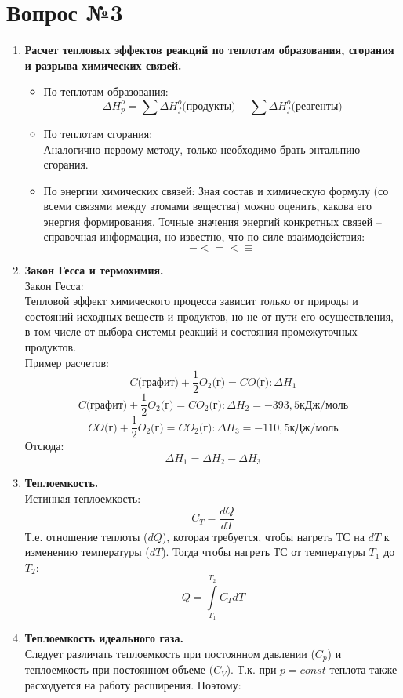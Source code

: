 \documentclass[14pt,a4paper]{scrartcl}
\begin{document}
\section*{Вопрос №3}	
	\begin{enumerate}[label=\arabic*)]
		\item \textbf{Расчет тепловых эффектов реакций по теплотам образования, сгорания и разрыва химических связей.}
		\begin{itemize}
			\item По теплотам образования: 
			$$\Delta{H_{p}^{o}} = \sum \Delta{H_{f}^o} \text{(продукты)} - \sum \Delta{H_{f}^o} \text{(реагенты)}  $$
			\item По теплотам сгорания: \\
			Аналогично первому методу, только необходимо брать энтальпию сгорания.
			\item По энергии химических связей:
			Зная состав и химическую формулу (со всеми связями между атомами вещества) можно оценить, какова его энергия формирования. Точные значения энергий конкретных связей -- справочная информация, но известно, что по силе взаимодействия:
			$$ -  <  =  <  \equiv $$
		\end{itemize}
		\item \textbf{Закон Гесса и термохимия.} \\
		Закон Гесса: \\
		Тепловой эффект химического процесса зависит только от природы и состояний исходных веществ и продуктов, но не от пути его осуществления, в том числе от выбора системы реакций и состояния промежуточных продуктов. \\
		Пример расчетов: \\
		$$C\text{(графит)} + \frac{1}{2}O_2\text{(г)} = CO\text{(г)}: \Delta{H_1}$$  
		$$C\text{(графит)} + \frac{1}{2}O_2\text{(г)} = CO_2\text{(г)}: \Delta{H_2} = -393,5 \text{кДж/моль}$$  			
		$$CO\text{(г)} + \frac{1}{2}O_2\text{(г)} = CO_2\text{(г)}: \Delta{H_3} = -110,5 \text{кДж/моль} $$  
		Отсюда:
		$$\Delta{H_1} = \Delta{H_2} - \Delta{H_3} $$
		\item \textbf{Теплоемкость.} \\		
		Истинная теплоемкость:
		$$C_T = \dfrac{dQ}{dT} $$
		Т.е. отношение теплоты ($dQ$), которая требуется, чтобы нагреть ТС на $dT$ к изменению температуры ($dT$). Тогда чтобы нагреть ТС от температуры $T_1$ до $T_2$:
		$$ Q = \int\limits_{T_1}^{T_2} C_T dT $$
		\item \textbf{Теплоемкость идеального газа.} \\
		Следует различать теплоемкость при постоянном давлении ($C_p$) и теплоемкость при постоянном объеме ($C_V$). Т.к. при $p=const$ теплота также расходуется на работу расширения. Поэтому:

\end{enumerate}
\end{document}
